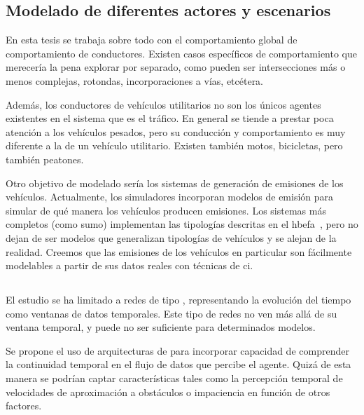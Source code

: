 \subsection{Modelado de diferentes actores y escenarios}

En esta tesis se trabaja sobre todo con el comportamiento global de comportamiento de conductores. Existen casos específicos de comportamiento que merecería la pena explorar por separado, como pueden ser intersecciones más o menos complejas, rotondas, incorporaciones a vías, etcétera.

Además, los conductores de vehículos utilitarios no son los únicos agentes existentes en el sistema que es el tráfico. En general se tiende a prestar poca atención a los vehículos pesados, pero su conducción y comportamiento es muy diferente a la de un vehículo utilitario. Existen también motos, bicicletas, pero también peatones.

Otro objetivo de modelado sería los sistemas de generación de emisiones de los vehículos. Actualmente, los simuladores incorporan modelos de emisión para simular de qué manera los vehículos producen emisiones. Los sistemas más completos (como \gls{sumo}) implementan las tipologías descritas en el \gls{hbefa}~\cite{de2004modelling}, pero no dejan de ser modelos que generalizan tipologías de vehículos y se alejan de la realidad. Creemos que las emisiones de los vehículos en particular son fácilmente modelables a partir de sus datos reales con técnicas de \ac{ci}.

\subsection{}

El estudio se ha limitado a redes de tipo \textit{}, representando la evolución del tiempo como ventanas de datos temporales. Este tipo de redes no ven más allá de su ventana temporal, y puede no ser suficiente para determinados modelos.

Se propone el uso de arquitecturas de  para incorporar capacidad de comprender la continuidad temporal en el flujo de datos que percibe el agente. Quizá de esta manera se podrían captar características tales como la percepción temporal de velocidades de aproximación a obstáculos o impaciencia en función de otros factores.


